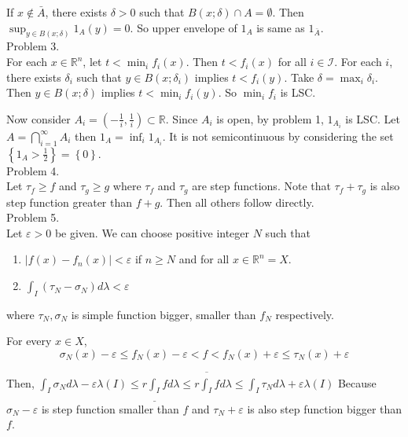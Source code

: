 If $x \notin \bar{A}$, there exists $\delta>0$ such that $B\left( x;\delta \right) \cap A = \emptyset$. Then $\sup_{y\in B\left( x ; \delta \right)}1_A(y) = 0$. So upper envelope of $1_A$ is same as $1_{\bar{A}}$.\\

Problem 3. \\

For each $x \in \mathbb{R}^n$, let $t < \min_{i}f_i(x)$. Then $t<f_i(x)$ for all $i \in \mathcal{I}$. For each $i$, there exists $\delta_i$ such that $y\in B\left( x;\delta_i \right)$ implies $t < f_i(y)$. Take $\delta = \max_{i}\delta_i$. Then $y \in B\left( x;\delta \right)$ implies $t <\min_{i} f_i(y)$. So $\min_{i}f_i $ is LSC.

Now consider $A_i = \left(- \frac{1}{i}, \frac{1}{i} \right)\subset \mathbb{R}$. Since $A_i$ is open, by problem 1, $1_{A_i}$ is LSC. Let $A = \bigcap_{i=1}^{\infty}A_i$ then $1_A = \inf_{i}1_{A_i}$. It is not semicontinuous by considering the set $\left\{ 1_A > \frac{1}{2} \right\}=\left\{ 0 \right\}$. \\

Problem 4. \\

Let $\tau_f \geq f$ and $\tau_g \geq g$ where $\tau_f$ and $\tau_g$ are step functions. Note that $\tau_f + \tau_g$ is also step function greater than $f+g$. Then all others follow directly. \\

Problem 5. \\

Let $\varepsilon>0$ be given. We can choose positive integer $N$ such that 

\begin{enumerate}
	\item $\left | f(x) - f_n(x) \right | < \varepsilon$ if $n \geq N$ and for all $x \in \mathbb{R}^n = X$.
	\item $\int_I\left ( \tau_N - \sigma_N\right ) d\lambda < \varepsilon$
\end{enumerate}

where $\tau_N, \sigma_N$ is simple function bigger, smaller than $f_N$ respectively.

For every $x\in X$,
\begin{equation*}
	\sigma_N(x) - \varepsilon \leq f_N(x) -\varepsilon < f < f_N(x) +\varepsilon \leq \tau_N(x) + \varepsilon
	\label{2}
\end{equation*}

Then, $\int_I \sigma_N d\lambda -\varepsilon \lambda\left( I \right) \leq r\underline{\int_I}fd\lambda \leq r\overline{\int_I}fd\lambda \leq \int_I \tau_N d\lambda + \varepsilon\lambda\left( I \right)$
Because $\sigma_N -\varepsilon$ is step function smaller than $f$ and $\tau_N + \varepsilon$ is also step function bigger than $f$. 

